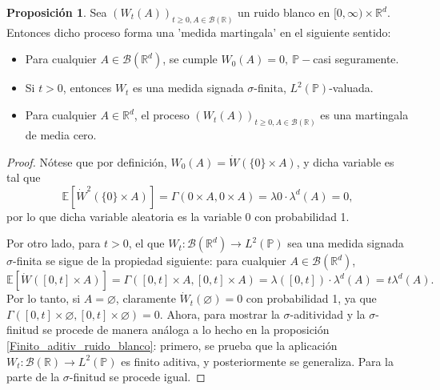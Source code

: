 \documentclass[letterpaper,twoside,12pt]{book}
\newcommand{\R}{\mathbb{R}}
\newcommand{\B}{\mathcal{B}}
\newcommand{\E}{\mathbb{E}}
\renewcommand{\P}{\mathbb{P}}
\newcommand{\W}{\dot{W}}
\newcommand{\1}{\mathds{1}}
\renewcommand{\to}{\rightarrow}
\theoremstyle{definition}
\theoremstyle{definition}
\theoremstyle{definition}
\theoremstyle{definition}
\newtheorem{prop}{Proposición}
\theoremstyle{definition}
\theoremstyle{definition}
\theoremstyle{definition}
\begin{document}
\begin{prop} 
Sea $(W_t(A))_{t\geq0, A\in \B(\R)}$ un ruido blanco en $[0,\infty)\times \R^{d}$. Entonces dicho proceso forma una 'medida martingala' en el siguiente sentido:
\begin{itemize}
    \item Para cualquier $A\in \B(\R^{d})$, se cumple $W_0(A)=0, \ \P-$casi seguramente.
    \item Si $t>0$, entonces $W_t$ es una medida signada $\sigma$-finita, $L^{2}(\P)$-valuada.
    \item Para cualquier $A\in \R^{d}$, el proceso $(W_t(A))_{t\geq0, A\in \B(\R)}$ es una martingala de media cero.
\end{itemize}
 \end{prop}
\begin{proof} 
  Nótese que por definición, $W_0(A)=\W(\{0\}\times A)$, y dicha variable es tal que 
  \[
  \E\left[\W^2(\{0\}\times A)\right]=\Gamma(0\times A,0\times A)=\lambda{0}\cdot\lambda^{d}(A)=0,  
  \]
  por lo que dicha variable aleatoria es la variable 0 con probabilidad 1.

  Por otro lado, para $t>0$, el que $W_t:\B(\R^{d})\to L^{2}(\P)$ sea una medida signada $\sigma$-finita se sigue de la propiedad siguiente: para cualquier $A\in \B(\R^{d})$, 
  \[
  \E\left[\W([0,t]\times A)\right]=\Gamma([0,t]\times A, [0,t]\times A)=\lambda([0,t])\cdot\lambda^{d}(A)=t\lambda^{d}(A). 
  \] 
  Por lo tanto, si $A=\varnothing$, claramente $\W_t(\varnothing)=0$ con probabilidad 1, ya que $\Gamma([0,t]\times\varnothing,[0,t]\times \varnothing)=0$. Ahora, para mostrar la $\sigma$-aditividad y la $\sigma$-finitud se procede de manera análoga a lo hecho en la proposición \ref{Finito_aditiv_ruido_blanco}: primero, se prueba que la aplicación $W_t:\B(\R)\to L^{2}(\P)$ es finito aditiva, y posteriormente se generaliza. Para la parte de la $\sigma$-finitud se procede igual.


\end{proof}
\end{document}
